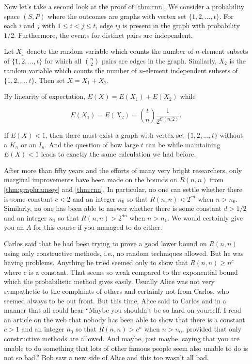 Now let's take a second look at the proof of \autoref{thm:rnn}.
We consider a probability space $(S,P)$ where the
outcomes are graphs with vertex set $\{1,2,\dots,t\}$.  For each
$i$ and $j$ with $1\le i < j\le t$, edge $ij$ is present
in the graph with probability $1/2$.  Furthermore, the
events for distinct pairs are independent.

Let $X_1$ denote the random variable which counts the number
of $n$-element subsets of $\{1,2,\dots,t\}$ for which all
$\binom{n}{2}$ pairs are edges in the graph.  Similarly,
$X_2$ is the random variable which counts the number
of $n$-element independent subsets of $\{1,2,\dots,t\}$.
Then set $X=X_1+X_2$.

By linearity of expectation, $E(X)=E(X_1)+E(X_2)$ while

\[
E(X_1)=E(X_2) = \binom{t}{n} \frac{1}{2^{C(n,2)}}.
\]

If $E(X)<1$, then there must exist a graph with vertex
set $\{1,2,\dots,t\}$ without a $K_n$ or an $I_n$.
And the question of how large $t$ can be while maintaining
$E(X)<1$ leads to exactly the same calculation we had before.

After more than fifty years and the efforts of many very bright
researchers, only marginal improvements have been made on the
bounds on $R(n,n)$ from \autoref{thm:graphramsey} and 
\autoref{thm:rnn}.  In particular, no one can settle
whether there is some constant $c<2$ and an integer $n_0$ so that $R(n,n)<
2^{cn}$ when $n>n_0$.  Similarly, no one has been able to answer
whether there is some constant $d>1/2$ and an integer $n_1$ so
that $R(n,n)>2^{dn}$ when $n>n_1$.  We would certainly give
you an $A$ for this course if you managed to do either.

Carlos said that he had been trying to prove a good lower bound
on $R(n,n)$ using only constructive methods, i.e., no random
techniques allowed.  But he was having problems.  Anything
he tried seemed only to show that $R(n,n)\ge n^c$ where $c$
is a constant.  That seems so weak compared to the exponential
bound which the probabilistic method gives easily.  Usually
Alice was not very sympathetic to the complaints of others and
certainly not from Carlos, who seemed always to be out front.
But this time, Alice said to Carlos and in a manner that all could
hear ``Maybe you shouldn't be so hard on yourself.  I read an
article on the web that nobody has been able to show that
there is a constant $c>1$ and an integer $n_0$ so that $R(n,n)>c^n$
when $n>n_0$, provided that only constructive methods are allowed.
And maybe, just maybe, saying that you are unable to do
something that lots of other famous people seem also unable
to do is not so bad.''  Bob saw a new side of Alice and this
too wasn't all bad.

